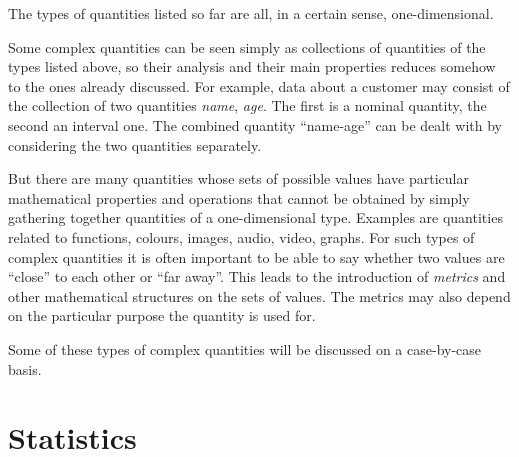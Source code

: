 \documentclass[
  a4paper,
  DIV=11,
  numbers=noendperiod,
  oneside]{scrreprt}
\begin{document}
The types of quantities listed so far are all, in a certain sense,
one-dimensional.

Some complex quantities can be seen simply as collections of quantities
of the types listed above, so their analysis and their main properties
reduces somehow to the ones already discussed. For example, data about a
customer may consist of the collection of two quantities \emph{name},
\emph{age}. The first is a nominal quantity, the second an interval one.
The combined quantity ``name-age'' can be dealt with by considering the
two quantities separately.

But there are many quantities whose sets of possible values have
particular mathematical properties and operations that cannot be
obtained by simply gathering together quantities of a one-dimensional
type. Examples are quantities related to functions, colours, images,
audio, video, graphs. For such types of complex quantities it is often
important to be able to say whether two values are ``close'' to each
other or ``far away''. This leads to the introduction of \emph{metrics}
and other mathematical structures on the sets of values. The metrics may
also depend on the particular purpose the quantity is used for.

Some of these types of complex quantities will be discussed on a
case-by-case basis.

\hypertarget{statistics}{%
\chapter{Statistics}\label{statistics}}

\providecommand{\ul}{\uline}
\renewcommand*{\|}[1][]{\nonscript\:#1\vert\nonscript\:\mathopen{}}
\providecommand*{\pr}[1]{\textsf{\small`#1'}}
\renewcommand*{\pr}[1]{\textsf{\small`#1'}}
\providecommand*{\prq}[1]{\textsf{\small #1}}

\providecommand{\se}[1]{\mathsfit{#1}}
\renewcommand{\se}[1]{\mathsfit{#1}}
\providecommand{\p}{\mathrm{p}}
\renewcommand{\p}{\mathrm{p}}
\renewcommand{\P}{\mathrm{P}}
\end{document}
